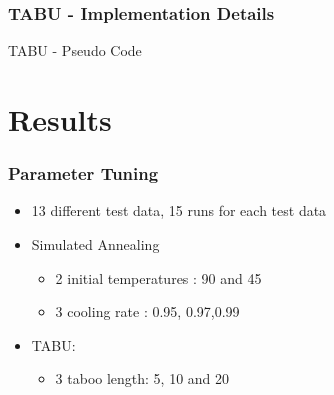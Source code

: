 \documentclass{beamer}
\makeatletter
\newenvironment{algorithm}[1][]{%
  \def\@captype{algorithm}%
  \par\nobreak\begin{center}\nobreak}
  {\par\nobreak\end{center}\nobreak}
\newcounter{algorithm}
\makeatother
\begin{document}
\begin{frame}[allowframebreaks] 
\frametitle{TABU  - Implementation Details}
\begin{algorithm}[H]
\begin{algorithmic}[1]
\REPEAT
{}
\ENDIF
{}
\ENDIF
{}
\end{algorithmic}
\caption{TABU - Pseudo Code}
\label{alg:seq}
\end{algorithm}
\end{frame}

\section{Results}

\begin{frame}
\frametitle{Parameter Tuning}
\begin{itemize}
\item 13 different test data, 15 runs for each test data
\item Simulated Annealing 
\begin{itemize}
\item 2 initial temperatures : 90 and 45
\item  3 cooling rate : 0.95, 	0.97,0.99
\end{itemize}
\item TABU: 
\begin{itemize}
\item 3 taboo length: 5, 10 and 20
\end{itemize}
\end{itemize}

\end{frame}
\end{document}

